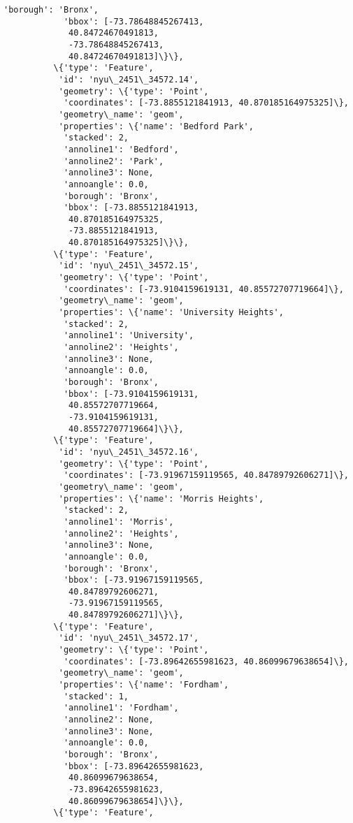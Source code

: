 \documentclass[11pt]{article}
\begin{document}
\begin{Verbatim}[commandchars=\\\{\}]
            'borough': 'Bronx',
            'bbox': [-73.78648845267413,
             40.84724670491813,
             -73.78648845267413,
             40.84724670491813]\}\},
          \{'type': 'Feature',
           'id': 'nyu\_2451\_34572.14',
           'geometry': \{'type': 'Point',
            'coordinates': [-73.8855121841913, 40.870185164975325]\},
           'geometry\_name': 'geom',
           'properties': \{'name': 'Bedford Park',
            'stacked': 2,
            'annoline1': 'Bedford',
            'annoline2': 'Park',
            'annoline3': None,
            'annoangle': 0.0,
            'borough': 'Bronx',
            'bbox': [-73.8855121841913,
             40.870185164975325,
             -73.8855121841913,
             40.870185164975325]\}\},
          \{'type': 'Feature',
           'id': 'nyu\_2451\_34572.15',
           'geometry': \{'type': 'Point',
            'coordinates': [-73.9104159619131, 40.85572707719664]\},
           'geometry\_name': 'geom',
           'properties': \{'name': 'University Heights',
            'stacked': 2,
            'annoline1': 'University',
            'annoline2': 'Heights',
            'annoline3': None,
            'annoangle': 0.0,
            'borough': 'Bronx',
            'bbox': [-73.9104159619131,
             40.85572707719664,
             -73.9104159619131,
             40.85572707719664]\}\},
          \{'type': 'Feature',
           'id': 'nyu\_2451\_34572.16',
           'geometry': \{'type': 'Point',
            'coordinates': [-73.91967159119565, 40.84789792606271]\},
           'geometry\_name': 'geom',
           'properties': \{'name': 'Morris Heights',
            'stacked': 2,
            'annoline1': 'Morris',
            'annoline2': 'Heights',
            'annoline3': None,
            'annoangle': 0.0,
            'borough': 'Bronx',
            'bbox': [-73.91967159119565,
             40.84789792606271,
             -73.91967159119565,
             40.84789792606271]\}\},
          \{'type': 'Feature',
           'id': 'nyu\_2451\_34572.17',
           'geometry': \{'type': 'Point',
            'coordinates': [-73.89642655981623, 40.86099679638654]\},
           'geometry\_name': 'geom',
           'properties': \{'name': 'Fordham',
            'stacked': 1,
            'annoline1': 'Fordham',
            'annoline2': None,
            'annoline3': None,
            'annoangle': 0.0,
            'borough': 'Bronx',
            'bbox': [-73.89642655981623,
             40.86099679638654,
             -73.89642655981623,
             40.86099679638654]\}\},
          \{'type': 'Feature',

\end{Verbatim}
\end{document}
